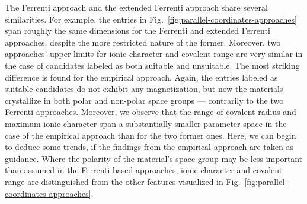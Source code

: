 \documentclass[superscriptaddress,unsortedaddress,
 amsmath,amssymb,
 aps,
]{revtex4-2}
\begin{document}
The Ferrenti approach and the extended Ferrenti approach share several similarities. For example, the entries in  Fig.~\ref{fig:parallel-coordinates-approaches} span roughly the same dimensions for the Ferrenti and extended Ferrenti approaches, despite the more restricted nature of the former.  
Moreover, two approaches' upper limits for ionic character and covalent range are very similar in the case of candidates labeled as both suitable and unsuitable.   
The most striking difference is found for the empirical approach. Again, the entries labeled as suitable candidates do not exhibit any magnetization, but now the materials crystallize in both polar and non-polar space groups --- contrarily to the two Ferrenti approaches. Moreover, we observe that the range of covalent radius and maximum ionic character span a substantially smaller parameter space in the case of the empirical approach than for the two former ones.  
Here, we can begin to deduce some trends, if the findings from the empirical approach are taken as guidance. Where the polarity of the material's space group may be less important than assumed in the Ferrenti based approaches, ionic character and covalent range are distinguished from the other features visualized in Fig.~\ref{fig:parallel-coordinates-approaches}. 
\end{document}
